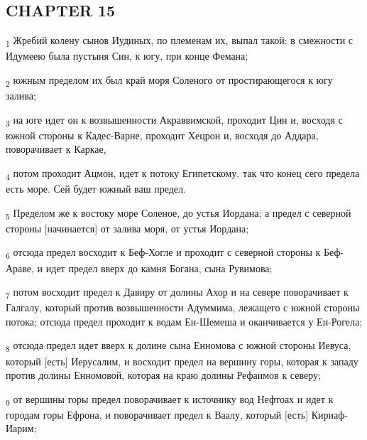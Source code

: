 \subsection{CHAPTER 15}
\begin{tcolorbox}
\textsubscript{1} Жребий колену сынов Иудиных, по племенам их, выпал такой: в смежности с Идумеею была пустыня Син, к югу, при конце Фемана;
\end{tcolorbox}
\begin{tcolorbox}
\textsubscript{2} южным пределом их был край моря Соленого от простирающегося к югу залива;
\end{tcolorbox}
\begin{tcolorbox}
\textsubscript{3} на юге идет он к возвышенности Акраввимской, проходит Цин и, восходя с южной стороны к Кадес-Варне, проходит Хецрон и, восходя до Аддара, поворачивает к Каркае,
\end{tcolorbox}
\begin{tcolorbox}
\textsubscript{4} потом проходит Ацмон, идет к потоку Египетскому, так что конец сего предела есть море. Сей будет южный ваш предел.
\end{tcolorbox}
\begin{tcolorbox}
\textsubscript{5} Пределом же к востоку море Соленое, до устья Иордана; а предел с северной стороны [начинается] от залива моря, от устья Иордана;
\end{tcolorbox}
\begin{tcolorbox}
\textsubscript{6} отсюда предел восходит к Беф-Хогле и проходит с северной стороны к Беф-Араве, и идет предел вверх до камня Богана, сына Рувимова;
\end{tcolorbox}
\begin{tcolorbox}
\textsubscript{7} потом восходит предел к Давиру от долины Ахор и на севере поворачивает к Галгалу, который против возвышенности Адуммима, лежащего с южной стороны потока; отсюда предел проходит к водам Ен-Шемеша и оканчивается у Ен-Рогела;
\end{tcolorbox}
\begin{tcolorbox}
\textsubscript{8} отсюда предел идет вверх к долине сына Енномова с южной стороны Иевуса, который [есть] Иерусалим, и восходит предел на вершину горы, которая к западу против долины Енномовой, которая на краю долины Рефаимов к северу;
\end{tcolorbox}
\begin{tcolorbox}
\textsubscript{9} от вершины горы предел поворачивает к источнику вод Нефтоах и идет к городам горы Ефрона, и поворачивает предел к Ваалу, который [есть] Кириаф-Иарим;
\end{tcolorbox}
